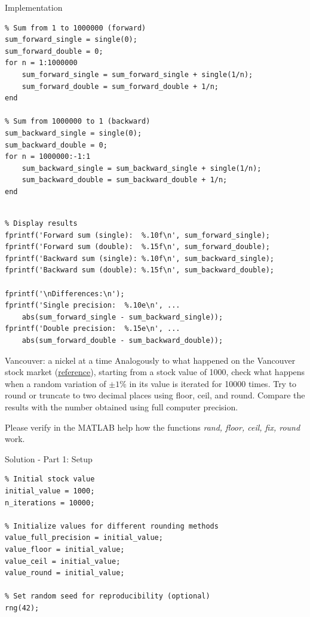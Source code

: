 \documentclass[aspectratio=169]{beamer}
\begin{document}
\begin{frame}[fragile]{Implementation}
    \begin{verbatim}
% Sum from 1 to 1000000 (forward)
sum_forward_single = single(0);
sum_forward_double = 0;
for n = 1:1000000
    sum_forward_single = sum_forward_single + single(1/n);
    sum_forward_double = sum_forward_double + 1/n;
end

% Sum from 1000000 to 1 (backward)
sum_backward_single = single(0);
sum_backward_double = 0;
for n = 1000000:-1:1
    sum_backward_single = sum_backward_single + single(1/n);
    sum_backward_double = sum_backward_double + 1/n;
end
    \end{verbatim}
\end{frame}

\begin{frame}[fragile]{}
    \begin{verbatim}

% Display results
fprintf('Forward sum (single):  %.10f\n', sum_forward_single);
fprintf('Forward sum (double):  %.15f\n', sum_forward_double);
fprintf('Backward sum (single): %.10f\n', sum_backward_single);
fprintf('Backward sum (double): %.15f\n', sum_backward_double);

fprintf('\nDifferences:\n');
fprintf('Single precision:  %.10e\n', ...
    abs(sum_forward_single - sum_backward_single));
fprintf('Double precision:  %.15e\n', ...
    abs(sum_forward_double - sum_backward_double));
    \end{verbatim}
\end{frame}

\begin{frame}{Vancouver: a nickel at a time}
    Analogously to what happened on the Vancouver stock market (\href{https://slate.com/technology/2019/10/round-floor-software-errors-stock-market-battlefield.html}{reference}), starting from a stock value of 1000, check what happens when a random variation of $\pm1\%$ in its value is iterated for 10000 times. Try to round or truncate to \alert{two decimal places} using floor, ceil, and round. Compare the results with the number obtained using full computer precision.
   
    Please verify in the MATLAB help how the functions {\it rand, floor, ceil, fix, round} work.
\end{frame}

\begin{frame}[fragile]{Solution - Part 1: Setup}
    \begin{verbatim}
% Initial stock value
initial_value = 1000;
n_iterations = 10000;

% Initialize values for different rounding methods
value_full_precision = initial_value;
value_floor = initial_value;
value_ceil = initial_value;
value_round = initial_value;

% Set random seed for reproducibility (optional)
rng(42);
    \end{verbatim}
\end{frame}
\end{document}
